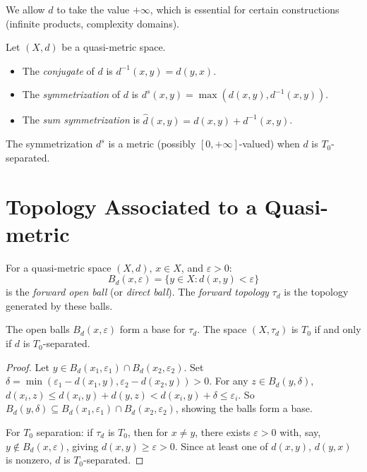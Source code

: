 \begin{remark}
We allow $d$ to take the value $+\infty$, which is essential for certain constructions
(infinite products, complexity domains).
\end{remark}

\begin{definition}
Let $(X,d)$ be a quasi-metric space.
\begin{itemize}
  \item The \emph{conjugate} of $d$ is $d^{-1}(x,y) = d(y,x)$.
  \item The \emph{symmetrization} of $d$ is $d^s(x,y) = \max(d(x,y), d^{-1}(x,y))$.
  \item The \emph{sum symmetrization} is $\hat{d}(x,y) = d(x,y) + d^{-1}(x,y)$.
\end{itemize}
The symmetrization $d^s$ is a metric (possibly $[0,+\infty]$-valued) when $d$ is
$T_0$-separated.
\end{definition}

\section{Topology Associated to a Quasi-metric}

\begin{definition}
For a quasi-metric space $(X,d)$, $x \in X$, and $\varepsilon > 0$:
\[
  B_d(x,\varepsilon) = \{y \in X : d(x,y) < \varepsilon\}
\]
is the \emph{forward open ball} (or \emph{direct ball}). The \emph{forward topology}
$\tau_d$ is the topology generated by these balls.
\end{definition}

\begin{proposition}
The open balls $B_d(x,\varepsilon)$ form a base for $\tau_d$. The space $(X, \tau_d)$ is
$T_0$ if and only if $d$ is $T_0$-separated.
\end{proposition}

\begin{proof}
Let $y \in B_d(x_1,\varepsilon_1) \cap B_d(x_2,\varepsilon_2)$. Set
$\delta = \min(\varepsilon_1 - d(x_1,y), \varepsilon_2 - d(x_2,y)) > 0$. For any
$z \in B_d(y,\delta)$, $d(x_i,z) \leq d(x_i,y) + d(y,z) < d(x_i,y) + \delta \leq
\varepsilon_i$. So $B_d(y,\delta) \subseteq B_d(x_1,\varepsilon_1) \cap
B_d(x_2,\varepsilon_2)$, showing the balls form a base.

For $T_0$ separation: if $\tau_d$ is $T_0$, then for $x \neq y$, there exists
$\varepsilon > 0$ with, say, $y \notin B_d(x,\varepsilon)$, giving $d(x,y) \geq
\varepsilon > 0$. Since at least one of $d(x,y)$, $d(y,x)$ is nonzero, $d$ is
$T_0$-separated.
\end{proof}

